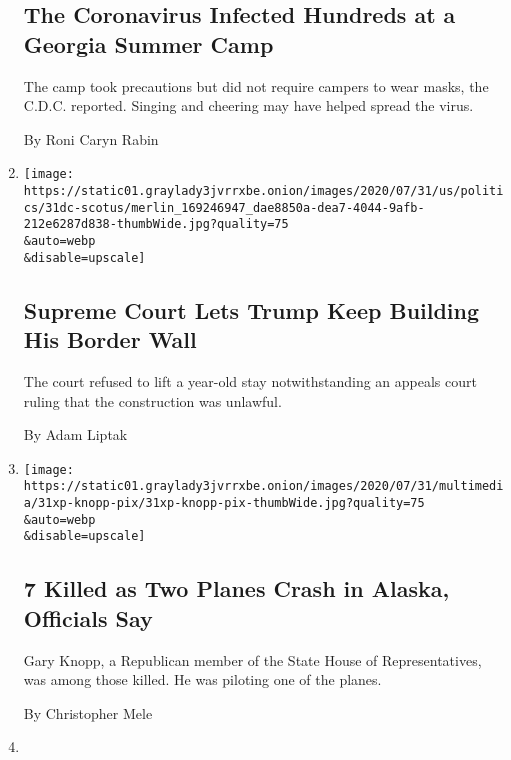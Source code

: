 \begin{enumerate}
  \hypertarget{the-coronavirus-infected-hundreds-at-a-georgia-summer-camp}{%
  \subsection{The Coronavirus Infected Hundreds at a Georgia Summer
  Camp}\label{the-coronavirus-infected-hundreds-at-a-georgia-summer-camp}}

  The camp took precautions but did not require campers to wear masks,
  the C.D.C. reported. Singing and cheering may have helped spread the
  virus.

  By Roni Caryn Rabin
\item
  \href{/2020/07/31/us/supreme-court-trump-border-wall.html}{}

  \texttt{[image: https://static01.graylady3jvrrxbe.onion/images/2020/07/31/us/politics/31dc-scotus/merlin\_169246947\_dae8850a-dea7-4044-9afb-212e6287d838-thumbWide.jpg?quality=75\\\&auto=webp\\\&disable=upscale]}

  \hypertarget{supreme-court-lets-trump-keep-building-his-border-wall}{%
  \subsection{Supreme Court Lets Trump Keep Building His Border
  Wall}\label{supreme-court-lets-trump-keep-building-his-border-wall}}

  The court refused to lift a year-old stay notwithstanding an appeals
  court ruling that the construction was unlawful.

  By Adam Liptak
\item
  \href{/2020/07/31/us/alaska-plane-crash-gary-knopp.html}{}

  \texttt{[image: https://static01.graylady3jvrrxbe.onion/images/2020/07/31/multimedia/31xp-knopp-pix/31xp-knopp-pix-thumbWide.jpg?quality=75\\\&auto=webp\\\&disable=upscale]}

  \hypertarget{7-killed-as-two-planes-crash-in-alaska-officials-say}{%
  \subsection{7 Killed as Two Planes Crash in Alaska, Officials
  Say}\label{7-killed-as-two-planes-crash-in-alaska-officials-say}}

  Gary Knopp, a Republican member of the State House of Representatives,
  was among those killed. He was piloting one of the planes.

  By Christopher Mele
\item
  \href{/2020/07/31/us/politics/trump-campaign-tv-advertising.html}{}


\end{enumerate}
